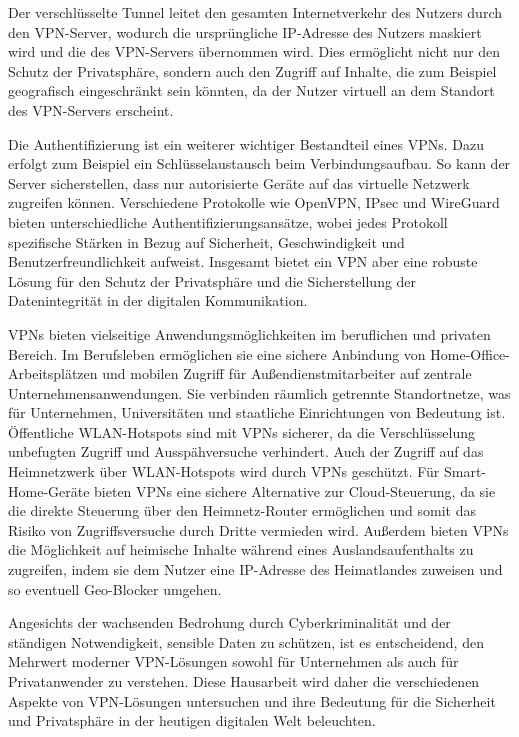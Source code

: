Der verschlüsselte Tunnel leitet den gesamten Internetverkehr des Nutzers durch den \gls{VPN}-Server, wodurch die ursprüngliche IP-Adresse des Nutzers maskiert wird und die des \gls{VPN}-Servers übernommen wird. Dies ermöglicht nicht nur den Schutz der Privatsphäre, sondern auch den Zugriff auf Inhalte, die zum Beispiel geografisch eingeschränkt sein könnten, da der Nutzer virtuell an dem Standort des \gls{VPN}-Servers erscheint. \cite{Vergleich_der_besten_VPN-Protokolle_Nord_VPN}\cite{Wie_funktioniert_ein_Virtual_Private_Network_VPN}

Die Authentifizierung ist ein weiterer wichtiger Bestandteil eines \gls{VPN}s. Dazu erfolgt zum Beispiel ein Schlüsselaustausch beim Verbindungsaufbau. So kann der Server sicherstellen, dass nur autorisierte Geräte auf das virtuelle Netzwerk zugreifen können. Verschiedene Protokolle wie OpenVPN, \gls{IPsec} und WireGuard bieten unterschiedliche Authentifizierungsansätze, wobei jedes Protokoll spezifische Stärken in Bezug auf Sicherheit, Geschwindigkeit und Benutzerfreundlichkeit aufweist. Insgesamt bietet ein \gls{VPN} aber eine robuste Lösung für den Schutz der Privatsphäre und die Sicherstellung der Datenintegrität in der digitalen Kommunikation. \cite{Wie_funktioniert_ein_Virtual_Private_Network_VPN}

\gls{VPN}s bieten vielseitige Anwendungsmöglichkeiten im beruflichen und privaten Bereich. Im Berufsleben ermöglichen sie eine sichere Anbindung von Home-Office-Arbeitsplätzen und mobilen Zugriff für Außendienstmitarbeiter auf zentrale Unternehmensanwendungen. Sie verbinden räumlich getrennte Standortnetze, was für Unternehmen, Universitäten und staatliche Einrichtungen von Bedeutung ist. Öffentliche WLAN-Hotspots sind mit \gls{VPN}s sicherer, da die Verschlüsselung unbefugten Zugriff und Ausspähversuche verhindert. Auch der Zugriff auf das Heimnetzwerk über WLAN-Hotspots wird durch \gls{VPN}s geschützt. Für Smart-Home-Geräte bieten \gls{VPN}s eine sichere Alternative zur Cloud-Steuerung, da sie die direkte Steuerung über den Heimnetz-Router ermöglichen und somit das Risiko von Zugriffsversuche durch Dritte vermieden wird. Außerdem bieten \gls{VPN}s die Möglichkeit auf heimische Inhalte während eines Auslandsaufenthalts zu zugreifen, indem sie dem Nutzer eine \gls{IP}-Adresse des Heimatlandes zuweisen und so eventuell Geo-Blocker umgehen. \cite{Wie_funktioniert_ein_Virtual_Private_Network_VPN}

Angesichts der wachsenden Bedrohung durch Cyberkriminalität und der ständigen Notwendigkeit, sensible Daten zu schützen, ist es entscheidend, den Mehrwert moderner \gls{VPN}-Lösungen sowohl für Unternehmen als auch für Privatanwender zu verstehen. Diese Hausarbeit wird daher die verschiedenen Aspekte von \gls{VPN}-Lösungen untersuchen und ihre Bedeutung für die Sicherheit und Privatsphäre in der heutigen digitalen Welt beleuchten.